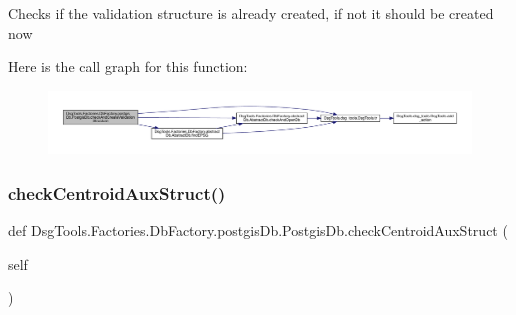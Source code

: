 \begin{DoxyVerb}Checks if the validation structure is already created, if not it should be created now
\end{DoxyVerb}
 Here is the call graph for this function\+:
\nopagebreak
\begin{figure}[H]
\begin{center}
\leavevmode
\includegraphics[width=350pt]{class_dsg_tools_1_1_factories_1_1_db_factory_1_1postgis_db_1_1_postgis_db_a8e1f9176191851a4f0433c1cb10b0c39_cgraph}
\end{center}
\end{figure}
\mbox{\label{class_dsg_tools_1_1_factories_1_1_db_factory_1_1postgis_db_1_1_postgis_db_a790e153106a996b3f70cddea3a922391}} 
\subsubsection{\texorpdfstring{check\+Centroid\+Aux\+Struct()}{checkCentroidAuxStruct()}}
{\footnotesize\ttfamily def Dsg\+Tools.\+Factories.\+Db\+Factory.\+postgis\+Db.\+Postgis\+Db.\+check\+Centroid\+Aux\+Struct (\begin{DoxyParamCaption}\item[{}]{self }\end{DoxyParamCaption})}

